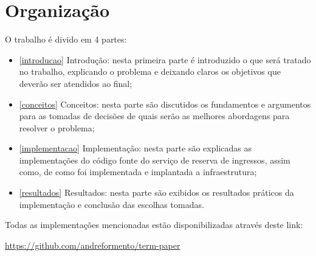 \section{Organização}

O trabalho é divido em 4 partes:

\begin{itemize}
    \item \autoref{introducao} Introdução: nesta primeira parte é introduzido o que
          será tratado no trabalho, explicando o problema e deixando claros os
          objetivos que deverão ser atendidos ao final;

    \item \autoref{conceitos} Conceitos: nesta parte são discutidos os fundamentos e
          argumentos para as tomadas de decisões de quais serão as melhores
          abordagens para resolver o problema;

    \item \autoref{implementacao} Implementação: nesta parte são explicadas as
          implementações do código fonte do serviço de reserva de ingressos, assim
          como, de como foi implementada e implantada a infraestrutura;

    \item \autoref{resultados} Resultados: nesta parte são exibidos os resultados
          práticos da implementação e conclusão das escolhas tomadas.

\end{itemize}

Todas as implementações mencionadas estão disponibilizadas através deste link:

\url{https://github.com/andreformento/term-paper}
